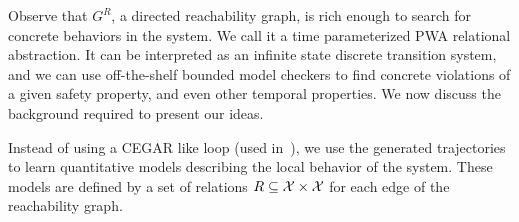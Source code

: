 Observe that $G^R$, a directed reachability graph, is rich enough to
search for concrete behaviors in the system. We call it a time
parameterized PWA relational abstraction. It can be interpreted as an
infinite state discrete transition system, and we can use
off-the-shelf bounded model checkers to find concrete violations of a
given safety property, and even other temporal properties.  We now
discuss the background required to present our ideas.



Instead of using a CEGAR like loop (used in~\cite{zutshi2014multiple}),
we use the generated trajectories to learn quantitative models
describing the local behavior of the system. These models are defined
by a set of relations $R \subseteq \mathcal{X} \times \mathcal{X}$
for each edge of the reachability graph.
